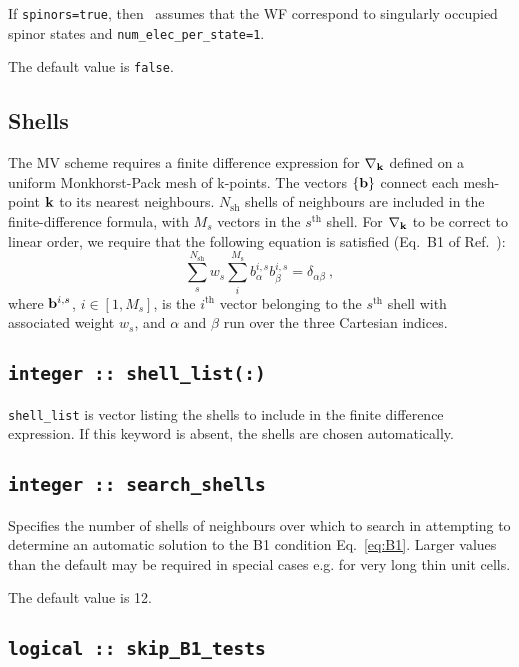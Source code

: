 If {\tt spinors=true}, then \wannier\ 
assumes that the WF correspond to singularly occupied spinor states and {\tt num\_elec\_per\_state=1}.

The default value is {\tt false}.

\subsection{Shells}

The MV scheme requires a finite difference expression
for $\nabla_{\bf k}$ defined on a uniform Monkhorst-Pack mesh of
k-points. The vectors $\{{\bf b}\}$ connect each mesh-point ${\bf k}$
  to its nearest neighbours. $N_{\mathrm{sh}}$ shells of neighbours
  are included in the finite-difference formula, with $M_s$ vectors in
  the $s^{\mathrm{th}}$ shell. For $\nabla_{{\bf k}}$ to be correct to
  linear order, we require that the following equation is satisfied
  (Eq.~B1 of Ref.~\cite{marzari-prb97}):
\begin{equation}\label{eq:B1}
\sum_{s}^{N_{\mathrm{sh}}} w_s \sum_i^{M_{\mathrm{s}}}
b_{\alpha}^{i,s} b_{\beta}^{i,s} = \delta_{\alpha\beta}\:, 
\end{equation}
where ${\bf b}^{i,s}$, $i\in[1,M_s]$, is the
$i^{\mathrm{th}}$ vector belonging to the $s^{\mathrm{th}}$ shell
with associated weight $w_s$, and $\alpha$ and $\beta$ run over the
three Cartesian indices. 


\subsection[shell\_list]{\tt integer :: shell\_list(:)}

\verb#shell_list# is vector listing the shells
to include in the finite difference expression. If this keyword is
absent, the shells are chosen automatically.

\subsection[search\_shells]{\tt integer :: search\_shells}

Specifies the number of shells of neighbours over which to search in
attempting to determine an automatic solution to the B1 condition
Eq.~\ref{eq:B1}. Larger values than the default may be required in special
cases e.g. for very long thin unit cells. 

The default value is 12.

\subsection[skip\_B1\_tests]{\tt logical :: skip\_B1\_tests}

